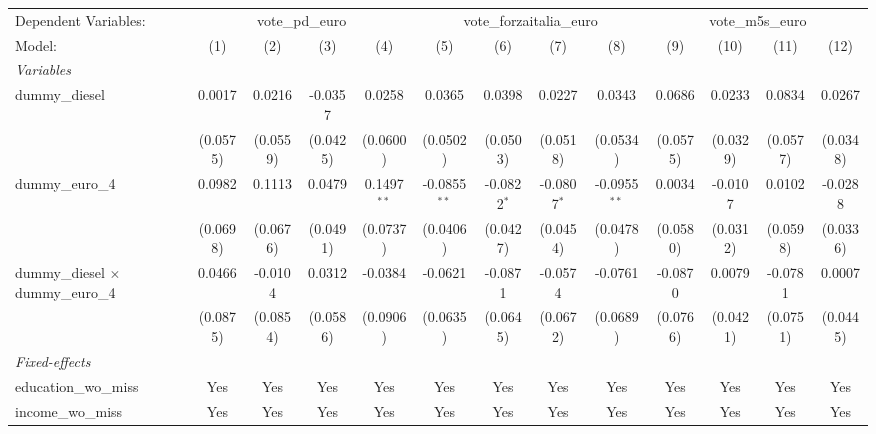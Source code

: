 
\begingroup
\centering
\begin{tabular}{lcccccccccccc}
   \tabularnewline \midrule \midrule
   Dependent Variables: & \multicolumn{4}{c}{vote\_pd\_euro} & \multicolumn{4}{c}{vote\_forzaitalia\_euro} & \multicolumn{4}{c}{vote\_m5s\_euro}\\
   Model:                                    & (1)      & (2)      & (3)      & (4)           & (5)            & (6)           & (7)           & (8)            & (9)      & (10)     & (11)     & (12)\\  
   \midrule
   \emph{Variables}\\
   dummy\_diesel                             & 0.0017   & 0.0216   & -0.0357  & 0.0258        & 0.0365         & 0.0398        & 0.0227        & 0.0343         & 0.0686   & 0.0233   & 0.0834   & 0.0267\\   
                                             & (0.0575) & (0.0559) & (0.0425) & (0.0600)      & (0.0502)       & (0.0503)      & (0.0518)      & (0.0534)       & (0.0575) & (0.0329) & (0.0577) & (0.0348)\\   
   dummy\_euro\_4                            & 0.0982   & 0.1113   & 0.0479   & 0.1497$^{**}$ & -0.0855$^{**}$ & -0.0822$^{*}$ & -0.0807$^{*}$ & -0.0955$^{**}$ & 0.0034   & -0.0107  & 0.0102   & -0.0288\\   
                                             & (0.0698) & (0.0676) & (0.0491) & (0.0737)      & (0.0406)       & (0.0427)      & (0.0454)      & (0.0478)       & (0.0580) & (0.0312) & (0.0598) & (0.0336)\\   
   dummy\_diesel $\times$ dummy\_euro\_4     & 0.0466   & -0.0104  & 0.0312   & -0.0384       & -0.0621        & -0.0871       & -0.0574       & -0.0761        & -0.0870  & 0.0079   & -0.0781  & 0.0007\\   
                                             & (0.0875) & (0.0854) & (0.0586) & (0.0906)      & (0.0635)       & (0.0645)      & (0.0672)      & (0.0689)       & (0.0766) & (0.0421) & (0.0751) & (0.0445)\\   
   \midrule
   \emph{Fixed-effects}\\
   education\_wo\_miss                       & Yes      & Yes      & Yes      & Yes           & Yes            & Yes           & Yes           & Yes            & Yes      & Yes      & Yes      & Yes\\  
   income\_wo\_miss                          & Yes      & Yes      & Yes      & Yes           & Yes            & Yes           & Yes           & Yes            & Yes      & Yes      & Yes      & Yes\\  

\end{tabular}
